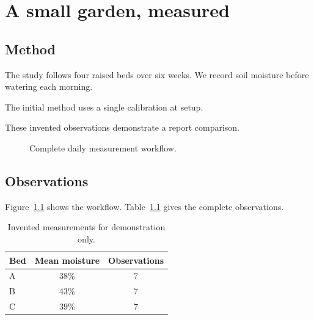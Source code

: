\documentclass[12pt,a4paper]{report}
\begin{document}
\chapter{A small garden, measured}
\section{Method}
The study follows four raised beds over six weeks.
We record soil moisture before watering each morning.

The initial method uses a single calibration at setup.

These invented observations demonstrate a report comparison.
\begin{figure}[H]\centering
{}
\caption{Complete daily measurement workflow.}\label{fig:workflow}
\end{figure}
\section{Observations}
Figure~\ref{fig:workflow} shows the workflow. Table~\ref{tab:observations} gives the complete observations.
\begin{table}[H]\centering
\caption{Invented measurements for demonstration only.}\label{tab:observations}
\begin{tabular}{lcc}\toprule
Bed & Mean moisture & Observations\\\midrule
A & 38\% & 7\\
B & 43\% & 7\\
C & 39\% & 7\\

\bottomrule\end{tabular}
\end{table}
\end{document}
